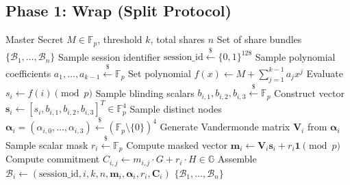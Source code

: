 \documentclass[10pt,journal,compsoc]{IEEEtran}
\begin{document}
\subsection{Phase 1: Wrap (Split Protocol)}
\begin{algorithm}[H]
\caption{TCW-Mask Split ($\text{Wrap}$)}
\begin{algorithmic}[1]
\Require Master Secret $M \in \mathbb{F}_p$, threshold $k$, total shares $n$
\Ensure Set of share bundles $\{\mathcal{B}_1, \dots, \mathcal{B}_n\}$
\State Sample session identifier $\text{session\_id} \xleftarrow{\$} \{0, 1\}^{128}$
\State Sample polynomial coefficients $a_1, \dots, a_{k-1} \xleftarrow{\$} \mathbb{F}_p$
\State Set polynomial $f(x) \gets M + \sum_{j=1}^{k-1} a_j x^j$
    \State Evaluate $s_i \gets f(i) \pmod p$
    \State Sample blinding scalars $b_{i, 1}, b_{i, 2}, b_{i, 3} \xleftarrow{\$} \mathbb{F}_p$
    \State Construct vector $\mathbf{s}_i \gets [s_i, b_{i, 1}, b_{i, 2}, b_{i, 3}]^T \in \mathbb{F}_p^4$
    \State Sample distinct nodes $\boldsymbol{\alpha}_i = (\alpha_{i, 0}, \dots, \alpha_{i, 3}) \xleftarrow{\$} (\mathbb{F}_p \setminus \{0\})^4$
    \State Generate Vandermonde matrix $\mathbf{V}_i$ from $\boldsymbol{\alpha}_i$
    \State Sample scalar mask $r_i \xleftarrow{\$} \mathbb{F}_p$
    \State Compute masked vector $\mathbf{m}_i \gets \mathbf{V}_i \mathbf{s}_i + r_i \mathbf{1} \pmod p$
        \State Compute commitment $C_{i, j} \gets m_{i, j} \cdot G + r_i \cdot H \in \mathbb{G}$
    \EndFor
    \State Assemble $\mathcal{B}_i \gets (\text{session\_id}, i, k, n, \mathbf{m}_i, \boldsymbol{\alpha}_i, r_i, \mathbf{C}_i)$
\EndFor
\State \Return $\{\mathcal{B}_1, \dots, \mathcal{B}_n\}$
\end{algorithmic}
\end{algorithm}
\end{document}

